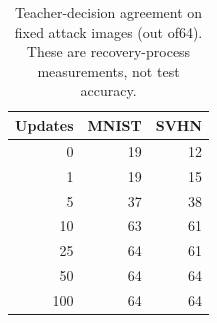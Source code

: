 \begin{table}[t]
\centering\small
\caption{Teacher-decision agreement on fixed attack images (out of64). These are recovery-process measurements, not test accuracy.}
\begin{tabular}{@{}rrr@{}}
\toprule
Updates & MNIST & SVHN \\
\midrule
0 & 19 & 12 \\
1 & 19 & 15 \\
5 & 37 & 38 \\
10 & 63 & 61 \\
25 & 64 & 61 \\
50 & 64 & 64 \\
100 & 64 & 64 \\
\bottomrule
\end{tabular}
\end{table}
